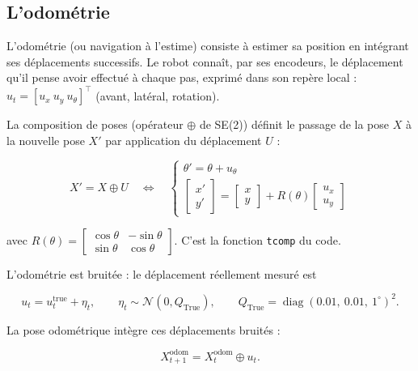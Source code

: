 \documentclass[11pt]{article}
\theoremstyle{remark}
\theoremstyle{definition}
\begin{document}
\subsection{L'odom\'etrie}

L'odom\'etrie (ou navigation \`a l'estime) consiste \`a estimer sa position en int\'egrant ses
d\'eplacements successifs. Le robot conna\^it, par ses encodeurs, le d\'eplacement qu'il pense avoir
effectu\'e \`a chaque pas, exprim\'e dans son rep\`ere local : $u_t = [u_x\ u_y\ u_\theta]^\top$
(avant, lat\'eral, rotation).

La composition de poses (op\'erateur $\oplus$ de SE(2)) d\'efinit le passage de la pose $X$ \`a la
nouvelle pose $X'$ par application du d\'eplacement $U$ :

\begin{equation}
X' = X \oplus U
\quad\Longleftrightarrow\quad
\begin{cases}
\theta' = \theta + u_\theta \\[2pt]
\begin{bmatrix} x' \\ y' \end{bmatrix}
= \begin{bmatrix} x \\ y \end{bmatrix}
+ R(\theta) \begin{bmatrix} u_x \\ u_y \end{bmatrix}
\end{cases}
\label{eq:oplus}
\end{equation}

avec $R(\theta) = \begin{bmatrix} \cos\theta & -\sin\theta \\ \sin\theta & \cos\theta \end{bmatrix}$.
C'est la fonction \texttt{tcomp} du code.

L'odom\'etrie est bruit\'ee : le d\'eplacement r\'eellement mesur\'e est

\begin{equation}
u_t = u_t^{\text{true}} + \eta_t,
\qquad
\eta_t \sim \mathcal{N}(0, Q_{\text{True}}),
\qquad
Q_{\text{True}} = \operatorname{diag}(0.01,\ 0.01,\ 1^\circ)^2 .
\end{equation}

La pose odom\'etrique int\`egre ces d\'eplacements bruit\'es :

\begin{equation}
X^{\text{odom}}_{t+1} = X^{\text{odom}}_t \oplus u_t .
\end{equation}
\end{document}
